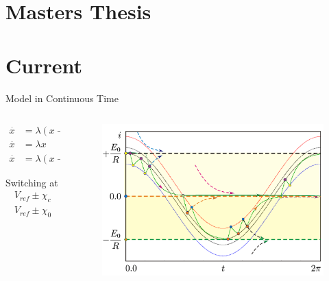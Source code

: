\section{Masters Thesis}

\section{Current}

\begin{frame}{Model in Continuous Time}
	\vspace{-1em}
	\begin{columns}
		\begin{column}{.3 \textwidth}
			\begin{align*}
				\overset{\cdot}{x} & = \lambda (x - 1) \quad & \text{if } & K_{F} = +1 \\
				\overset{\cdot}{x} & = \lambda x       \quad & \text{if } & K_{F} = 0  \\
				\overset{\cdot}{x} & = \lambda (x + 1) \quad & \text{if } & K_{F} = -1
			\end{align*}

			Switching at
			\begin{align*}
				V_{ref} \pm \chi_{c} \\
				V_{ref} \pm \chi_{0}
			\end{align*}
		\end{column}
		\begin{column}{.7 \textwidth}
			\begin{figure}
				\includegraphics[width=0.7 \textwidth]{Figs/continuous_model.png}
			\end{figure}

			\flushright{[Zhusubaliyev]}
		\end{column}
	\end{columns}
\end{frame}

